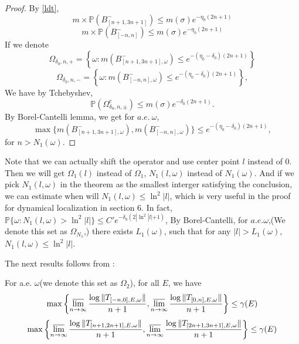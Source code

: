 \begin{proof}
By \eqref{ldt},
\[
m\times\mathbb{P}(B_{[n+1,3n+1]}^-)\leq m(\sigma)e^{-\eta_0(2n+1)}
\]
\[
m\times\mathbb{P}(B_{[-n,n]}^-)\leq m(\sigma)e^{-\eta_0(2n+1)}
\]
If we denote
    \[
      \Omega_{\delta_0,n,+}=\left\{\omega:m(B_{[n+1,3n+1],\omega}^-)\leq e^{-(\eta_0-\delta_0)(2n+1)}\right\}
    \]
    \[
    \Omega_{\delta_0,n,-}=\left\{\omega:m(B_{[-n,n],\omega}^-)\leq e^{-(\eta_0-\delta_0)(2n+1)}\right\},
    \]
We have by Tchebyshev,
\begin{equation}\label{A5}
      \mathbb{P}(\Omega_{\delta_0,n,\pm}^c)
      \leq m(\sigma)e^{-\delta_0(2n+1)}.
\end{equation}
By Borel-Cantelli lemma, we get for $a.e.~\omega$,
\[
\max\{m(B_{[n+1,3n+1],\omega}^-),m(B_{[-n,n],\omega}^-)\}\leq e^{-(\eta_0-\delta_0)(2n+1)},
\]
for $n>N_1(\omega)$.
\end{proof}
\begin{remark}\label{N1}
  Note that we can actually shift the operator and use center point $l$ instead of $0$. Then we will get $\Omega_1(l)$ instead of $\Omega_1$, $N_1(l,\omega)$ instead of $N_1(\omega)$. And if we pick $N_1(l,\omega)$ in the theorem as the smallest interger satisfying the conclusion, we can estimate when will $N_1(l,\omega)\leq \ln^2 |l|$, which is very useful in the proof for dynamical localization in section 6.
  In fact, $\mathbb{P}\{\omega: N_1(l,\omega)>\ln^2 |l|\}\leq C' e^{-\delta_0(2|\ln^2|l|+1)}$, By Borel-Cantelli, for $a.e.\omega$,(We denote this set as $\Omega_{N_1}$,) there exists $L_1(\omega)$, such that for any $|l|>L_1(\omega)$, $N_1(l,\omega)\leq \ln^2|l|$.
\end{remark}
The next results follows from :
\begin{thm}\label{CS}
  For a.e. $\omega$(we denote this set as $\Omega_2$), for all $E$, we have
  \begin{equation}\label{C}
      \max\left\{\varlimsup_{n\to\infty} \frac{ \log\Vert T_{[-n,0],E,\omega}\Vert}{n+1}, \varlimsup_{n\to\infty} \frac{\log\Vert T_{[0,n],E,\omega}\Vert}{n+1}\right\}\leq\gamma(E)
  \end{equation}
  \begin{equation}\label{D}
    \max\left\{\varlimsup_{n\to\infty} \frac{\log\Vert T_{[n+1,2n+1],E,\omega}\Vert}{n+1}, \varlimsup_{n\to\infty} \frac{\log\Vert T_{[2n+1,3n+1],E,\omega}\Vert}{n+1}\right\}\leq\gamma(E)
  \end{equation}
\end{thm}
